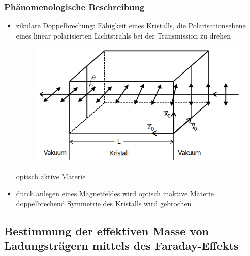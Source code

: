 \subsubsection*{Phänomenologische Beschreibung}
\begin{itemize}
    \item zikulare Doppelbrechung:
        Fähigkeit eines Kristalls, die Polarisationsebene eines linear polarisierten Lichtstrahls bei der Transmission zu drehen
        \begin{figure}[H]
            \centering
            \includegraphics[scale=0.5]{pictures/Doppelbrechung.png}
        \end{figure}
        \to optisch aktive Materie
    \item durch anlegen eines Magnetfeldes wird optisch inaktive Materie doppelbrechend
        \to Symmetrie des Kristalls wird gebrochen
\end{itemize}

\subsection{Bestimmung der effektiven Masse von Ladungsträgern mittels des Faraday-Effekts}
